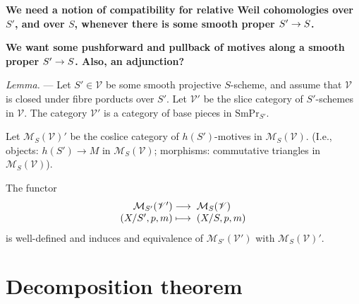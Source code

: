 \documentclass[a4paper,10pt]{article}
\def\fixme{\textbf}
\newenvironment{lemma}{\medskip\textit{Lemma.} --- }{}
\def\basepieces{\mathscr{V}}
\def\smpr{\mathrm{SmPr}}
\begin{document}
\fixme{We need a notion of compatibility for relative Weil cohomologies over
	$S'$, and over $S$, whenever there is some smooth proper
$\map{S'}{S}$.}

\fixme{We want some pushforward and pullback of motives along a smooth proper
$\map{S'}{S}$. Also, an adjunction?}

\begin{lemma} %
	Let $S' \in \basepieces$ be some smooth projective $S$-scheme, and
	assume that $\basepieces$ is closed under fibre porducts over $S'$. Let
	$\basepieces'$ be the slice category of $S'$-schemes in $\basepieces$.
	The category $\basepieces'$ is a category of base pieces in
	$\smpr_{S'}$.

	Let $\mathcal{M}_{S}(\basepieces)'$ be the coslice category of
	$h(S')$-motives in $\mathcal{M}_{S}(\basepieces)$. (I.e., objects:
	$h(S') \to M$ in $\mathcal{M}_{S}(\basepieces)$; morphisms: commutative
	triangles in $\mathcal{M}_{S}(\basepieces)$).

	The functor
	\[
		\map{\mathcal{M}_{S'}(\basepieces')}%
		{\mathcal{M}_{S}(\basepieces)}%
		[(X/S', p, m)][(X/S, p, m)]
	\]
	is well-defined and induces and equivalence of
	$\mathcal{M}_{S'}(\basepieces')$ with $\mathcal{M}_{S}(\basepieces)'$.
\end{lemma} %


\section{Decomposition theorem}
\end{document}
